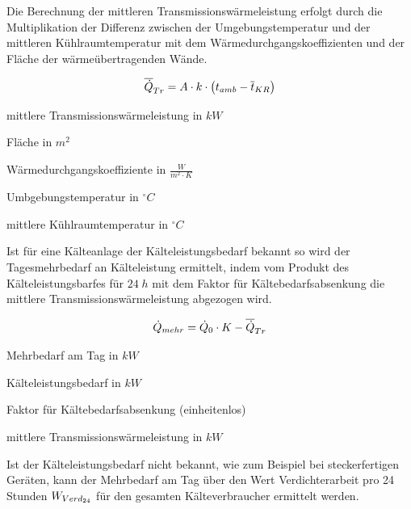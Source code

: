 Die Berechnung der mittleren Transmissionswärmeleistung erfolgt durch die
Multiplikation der Differenz zwischen der Umgebungstemperatur und der mittleren
Kühlraumtemperatur mit dem Wärmedurchgangskoeffizienten und der Fläche der
wärmeübertragenden Wände.

\begin{equation}
	\aptrans = A \cdot k \cdot \left( t_{amb} -
	\overline{t}_{KR} \right) \label{aptrans}
\end{equation}

\begin{description}[\dth]

	\item[$\aptrans$] mittlere Transmissionswärmeleistung in $kW$
	\item[$A$] Fläche in $m^2$
	\item[$k$] Wärmedurchgangskoeffiziente in $\frac{W}{m^2 \cdot K}$
	\item[$t_{amb}$] Umbgebungstemperatur in $^{\circ}C$
	\item[$\overline{t}_{KR}$] mittlere Kühlraumtemperatur in
		$^{\circ}C$
\end{description}
\vspace{0.5cm}

Ist f\"ur eine K\"alteanlage der K\"alteleistungsbedarf bekannt so wird der
Tagesmehrbedarf an K\"alteleistung ermittelt, indem vom Produkt des
K\"alteleistungsbarfes f\"ur $24\;h$ mit dem Faktor f\"ur
K\"altebedarfsabsenkung die mittlere Transmissionswärmeleistung abgezogen wird.

\begin{equation}
	\pmehr = \pkalt \cdot K - \aptrans
\label{pmehr}
\end{equation}

\begin{description}[\dth]

	\item[$\pmehr$] Mehrbedarf am Tag in $kW$
	\item[$\pkalt$] Kälteleistungsbedarf in $kW$
	\item[$K$] Faktor für Kältebedarfsabsenkung (einheitenlos)
	\item[$\aptrans$] mittlere Transmissionswärmeleistung in $kW$

\end{description}
\vspace{0.5cm}

Ist der Kälteleistungsbedarf nicht bekannt, wie zum Beispiel bei steckerfertigen
Geräten, kann der Mehrbedarf am Tag \"uber den Wert Verdichterarbeit pro 24
Stunden ${W}_{Verd_{24}}$ für den gesamten Kälteverbraucher ermittelt werden.


